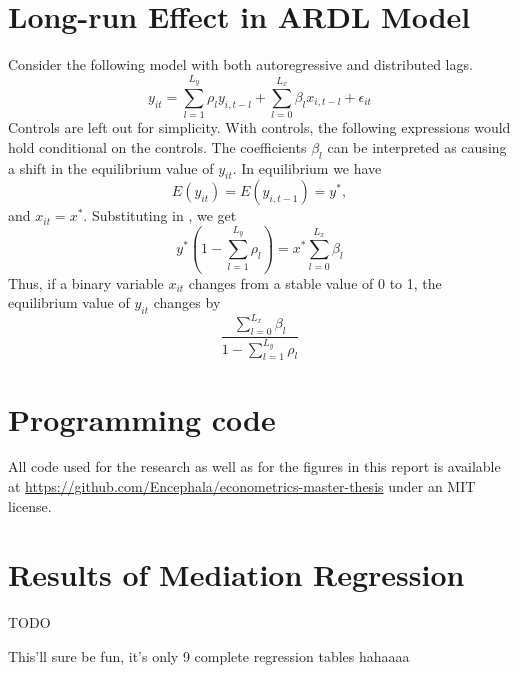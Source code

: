 \chapter{Long-run Effect in ARDL Model}
\label{chap:app:long_run_effect}
Consider the following model with both autoregressive and distributed lags.
\begin{equation}
    \label{eq:app:ardl_model}
    y_{it} = \sum_{l=1}^{L_y} \rho_l y_{i,t-l} + \sum_{l=0}^{L_x} \beta_l x_{i,t-l} + \epsilon_{it}
\end{equation}
Controls are left out for simplicity. With controls, the following expressions would hold conditional on the
controls.
The coefficients $\beta_l$ can be interpreted as causing a shift in the equilibrium value of $y_{it}$.
In equilibrium we have
\begin{equation}
    E(y_{it}) = E(y_{i,t-1}) = y^*,
\end{equation}
and $x_{it} = x^*$. Substituting in , we get
\begin{equation}
    y^* (1 - \sum_{l=1}^{L_y} \rho_l) = x^* \sum_{l=0}^{L_x} \beta_l
\end{equation}
Thus, if a binary variable $x_{it}$ changes from a stable value of  0 to 1, the equilibrium value of $y_{it}$ changes by
\begin{equation}
    \frac{\sum_{l=0}^{L_x} \beta_l}{1 - \sum_{l=1}^{L_y} \rho_l}
\end{equation}

\chapter{Programming code}
\label{chap:app:code}
All code used for the research as well as for the figures in this report is available at
\url{https://github.com/Encephala/econometrics-master-thesis} under an MIT license.

\chapter{Results of Mediation Regression}
\label{chap:app:mediation_regression}

TODO

This'll sure be fun, it's only 9 complete regression tables hahaaaa
